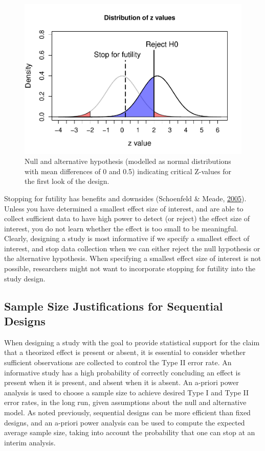 \documentclass[
  english,
  ,man,floatsintext]{apa6}
\begin{document}
\begin{figure}
\centering
\includegraphics{sequential_tutorial_files/figure-latex/futility3-1.pdf}
\caption{\label{fig:futility3}Null and alternative hypothesis (modelled as normal distributions with mean differences of 0 and 0.5) indicating critical Z-values for the first look of the design.}
\end{figure}

Stopping for futility has benefits and downsides (Schoenfeld \& Meade, \protect\hyperlink{ref-schoenfeld_procon_2005}{2005}). Unless you have determined a smallest effect size of interest, and are able to collect sufficient data to have high power to detect (or reject) the effect size of interest, you do not learn whether the effect is too small to be meaningful. Clearly, designing a study is most informative if we specify a smallest effect of interest, and stop data collection when we can either reject the null hypothesis or the alternative hypothesis. When specifying a smallest effect size of interest is not possible, researchers might not want to incorporate stopping for futility into the study design.

\hypertarget{sample-size-justifications-for-sequential-designs}{%
\subsection{Sample Size Justifications for Sequential Designs}\label{sample-size-justifications-for-sequential-designs}}

When designing a study with the goal to provide statistical support for the claim that a theorized effect is present or absent, it is essential to consider whether sufficient observations are collected to control the Type II error rate. An informative study has a high probability of correctly concluding an effect is present when it is present, and absent when it is absent. An a-priori power analysis is used to choose a sample size to achieve desired Type I and Type II error rates, in the long run, given assumptions about the null and alternative model. As noted previously, sequential designs can be more efficient than fixed designs, and an a-priori power analysis can be used to compute the expected average sample size, taking into account the probability that one can stop at an interim analysis.
\end{document}
